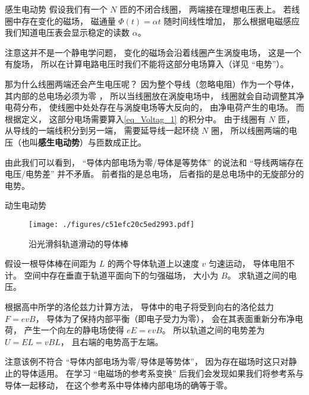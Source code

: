 \begin{example}{感生电动势}
假设我们有一个 $N$ 匝的不闭合线圈， 两端接在理想电压表上。 若线圈中存在变化的磁场， 磁通量 $\Phi(t) = \alpha t$ 随时间线性增加， 那么根据电磁感应我们知道电压表会显示稳定的读数 $\alpha$。

注意这并不是一个静电学问题， 变化的磁场会沿着线圈产生涡旋电场， 这是一个有旋场， 所以在计算电路电压时我们不能将这部分电场算入（详见 “电势”）。

那为什么线圈两端还会产生电压呢？ 因为整个导线（忽略电阻）作为一个导体， 其内部的总电场必须为零%
， 所以当线圈放在涡旋电场中， 线圈就会自动调整其净电荷分布， 使线圈中处处存在与涡旋电场等大反向的， 由净电荷产生的电场。 而根据定义， 这部分电场需要算入\autoref{eq_Voltag_1} 的积分中。 由于线圈有 $N$ 匝， 从导线的一端线积分到另一端， 需要延导线一起环绕 $N$ 圈， 所以线圈两端的电压（也叫\textbf{感生电动势}）与匝数成正比。
\end{example}

由此我们可以看到， “导体内部电场为零/导体是等势体” 的说法和 “导线两端存在电压/电势差” 并不矛盾。 前者指的是总电场， 后者指的是总电场中的无旋部分的电势。

\begin{example}{动生电动势}
\begin{figure}[ht]
\centering
\texttt{[image: ./figures/c51efc20c5ed2993.pdf]}
\caption{沿光滑斜轨道滑动的导体棒} \label{fig_Voltag_1}
\end{figure}
假设一根导体棒在间距为 $L$ 的两个导体轨道上以速度 $v$ 匀速运动， 导体电阻不计。 空间中存在垂直于轨道平面向下的匀强磁场， 大小为 $B$。 求轨道之间的电压。

根据高中所学的洛伦兹力计算方法， 导体中的电子将受到向右的洛伦兹力 $F = evB$， 导体为了保持内部平衡（即电子受力为零）， 会在其表面重新分布净电荷， 产生一个向左的静电场使得 $eE = evB$。 所以轨道之间的电势差为 $U = EL = vBL$， 且右端的电势高于左端。
\end{example}

注意该例不符合 “导体内部电场为零/导体是等势体”， 因为存在磁场时这只对静止的导体适用。 在学习 “电磁场的参考系变换” 后我们会发现如果我们将参考系与导体一起移动， 在这个参考系中导体棒内部电场的确等于零。
